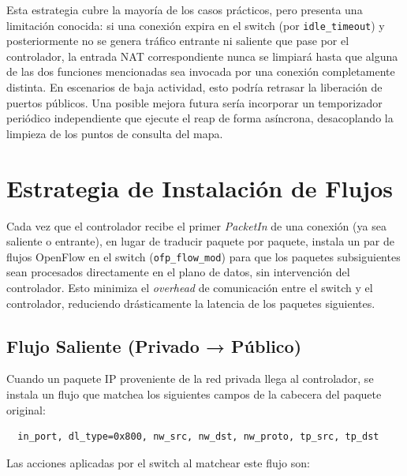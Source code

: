 \documentclass[11pt, a4paper]{article}
\begin{document}
Esta estrategia cubre la mayoría de los casos prácticos, pero presenta una limitación conocida: si una conexión expira en el switch (por \texttt{idle\_timeout}) y posteriormente no se genera tráfico entrante ni saliente que pase por el controlador, la entrada NAT correspondiente nunca se limpiará hasta que alguna de las dos funciones mencionadas sea invocada por una conexión completamente distinta. En escenarios de baja actividad, esto podría retrasar la liberación de puertos públicos. Una posible mejora futura sería incorporar un temporizador periódico independiente que ejecute el reap de forma asíncrona, desacoplando la limpieza de los puntos de consulta del mapa.


\section{Estrategia de Instalación de Flujos}
\label{sec:estrategia_flujos}

Cada vez que el controlador recibe el primer \textit{PacketIn} de una conexión (ya sea saliente o entrante), en lugar de traducir paquete por paquete, instala un par de flujos OpenFlow en el switch (\texttt{ofp\_flow\_mod}) para que los paquetes subsiguientes sean procesados directamente en el plano de datos, sin intervención del controlador. Esto minimiza el \textit{overhead} de comunicación entre el switch y el controlador, reduciendo drásticamente la latencia de los paquetes siguientes.

\subsection{Flujo Saliente (Privado → Público)}
\label{subsec:flow_out}

Cuando un paquete IP proveniente de la red privada llega al controlador, se instala un flujo que matchea los siguientes campos de la cabecera del paquete original:

\begin{verbatim}
  in_port, dl_type=0x800, nw_src, nw_dst, nw_proto, tp_src, tp_dst
\end{verbatim}

Las acciones aplicadas por el switch al matchear este flujo son:
\end{document}
